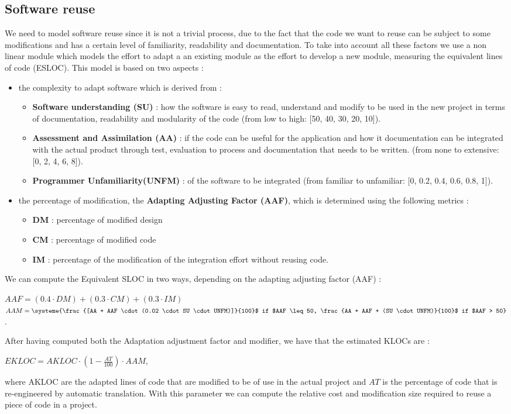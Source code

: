\documentclass[11pt]{article}
\begin{document}
\subsection{Software reuse}
We need to model software reuse since it is not a trivial process, due to the fact that the code we want to reuse can be subject to some modifications and has a certain level of familiarity, readability and documentation. To take into account all these factors we use a non linear module which models the effort to adapt a an existing module as the effort to develop a new module, measuring the equivalent lines of code (ESLOC). This model is based on two aspects :
\begin{itemize}
\item the complexity to adapt software which is derived from :
\begin{itemize}
\item \textbf{Software understanding (SU)} : how the software is easy to read, understand and modify to be used in the new project in terms of documentation, readability and modularity of the code (from low to high: [50, 40, 30, 20, 10]).
\item \textbf{Assessment and Assimilation (AA)} : if the code can be useful for the application and how it documentation can be integrated with the actual product through test, evaluation to process and documentation that needs to be written. (from none to extensive: [0, 2, 4, 6, 8]).
\item \textbf{Programmer Unfamiliarity(UNFM)} : of the software to be integrated (from familiar to unfamiliar: [0, 0.2, 0.4, 0.6, 0.8, 1]).
\end{itemize} 
\item the percentage of modification, the \textbf{Adapting Adjusting Factor (AAF)}, which is determined using the following metrics :
\begin{itemize}
\item \textbf{DM} : percentage of modified design
\item \textbf{CM} : percentage of modified code
\item \textbf{IM} : percentage of the modification of the integration effort without reusing code.
\end{itemize}
\end{itemize}
We can compute the Equivalent SLOC in two ways, depending on the adapting adjusting factor (AAF) :
\begin{center}
$AAF = (0.4 \cdot DM) + (0.3 \cdot CM) + (0.3 \cdot IM)$\\$AAM = \systeme{\frac{[AA + AAF \cdot (0.02 \cdot SU \cdot UNFM)]}{100}$ if $AAF \leq 50, \frac{AA + AAF + (SU \cdot UNFM)}{100}$ if $AAF > 50}$.
\end{center}
After having computed both the Adaptation adjustment factor and modifier, we have that the estimated KLOCs are :
\begin{center}
$EKLOC = AKLOC \cdot (1 - \frac{AT}{100}) \cdot AAM$,
\end{center}
where AKLOC are the adapted lines of code that are modified to be of use in the actual project and $AT$ is the percentage of code that is re-engineered by automatic translation. With this parameter we can compute the relative cost and modification size required to reuse a piece of code in a project.
\end{document}
